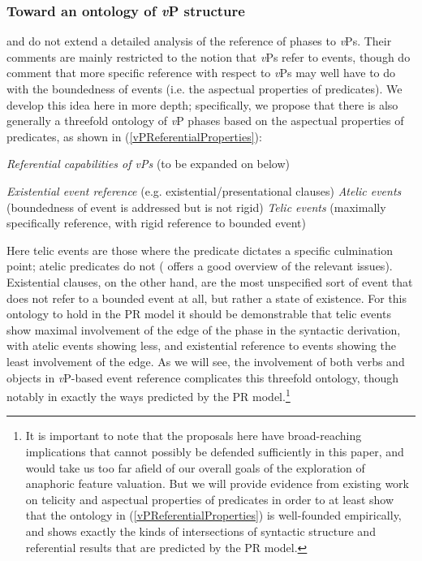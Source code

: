 \documentclass[output=paper
,modfonts
,nonflat
]{langsci/langscibook}
\begin{document}
\subsubsection{Toward an ontology of \textit{v}P structure}

\citet{SheehanHinzen:2011} and \citet{HinzenSheehan:2013} do not extend a detailed analysis of the reference of phases to \textit{v}Ps. Their comments are mainly restricted to the notion that \textit{v}Ps refer to events, though \citet{SheehanHinzen:2011} do comment that more specific reference with respect to \textit{v}Ps may well have to do with the boundedness of events (i.e. the aspectual properties of predicates). We develop this idea here in more depth; specifically, we propose that there is also generally a threefold ontology of \textit{v}P phases based on the aspectual properties of predicates, as shown in (\ref{vPReferentialProperties}):

\ea \label{vPReferentialProperties} \textit{Referential capabilities of \textit{v}Ps} (to be expanded on below)
\begin{xlist}
\ex \textit{Existential event reference} (e.g. existential/presentational clauses)
\ex \textit{Atelic events} (boundedness of event is addressed but is not rigid)
\ex \textit{Telic events} (maximally specifically reference, with rigid reference to bounded event)
\end{xlist}
\z
\noindent Here telic events are those where the predicate dictates a specific culmination point; atelic predicates do not (\citealt{Beavers:2012} offers a good overview of the relevant issues). Existential clauses, on the other hand, are the most unspecified sort of event that does not refer to a bounded event at all, but rather a state of existence. For this ontology to hold in the PR model it should be demonstrable that telic events show maximal involvement of the edge of the phase in the syntactic derivation, with atelic events showing less, and existential reference to events showing the least involvement of the edge. As we will see, the involvement of both verbs and objects in \textit{v}P-based event reference complicates this threefold ontology, though notably in exactly the ways predicted by the PR model.\footnote{It is important to note that the proposals here have broad-reaching implications that cannot possibly be defended sufficiently in this paper, and would take us too far afield of our overall goals of the exploration of anaphoric feature valuation. But we will provide evidence from existing work on telicity and aspectual properties of predicates in order to at least show that the ontology in (\ref{vPReferentialProperties}) is well-founded empirically, and shows exactly the kinds of intersections of syntactic structure and referential results that are predicted by the PR model.} 
\end{document}
